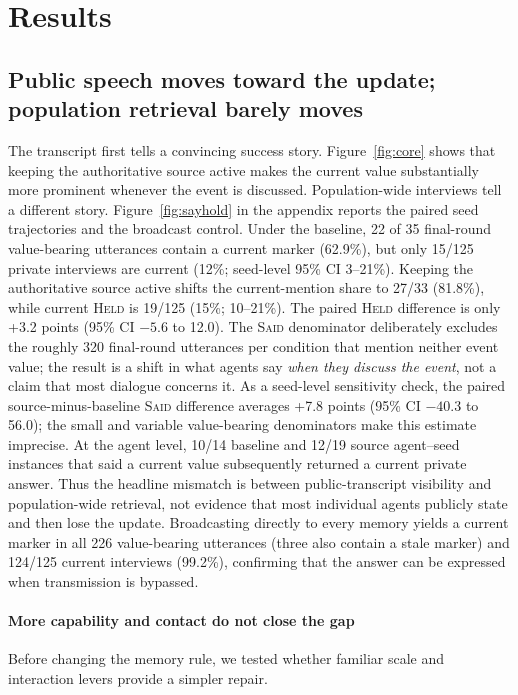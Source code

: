 \documentclass[sigconf,anonymous]{acmart}
\newcommand{\said}{\textsc{Said}}
\newcommand{\held}{\textsc{Held}}
\begin{document}
\section{Results}

\subsection{Public speech moves toward the update; population retrieval barely moves}

The transcript first tells a convincing success story.  Figure~\ref{fig:core} shows that keeping
the authoritative source active makes the current value substantially more prominent whenever
the event is discussed.  Population-wide interviews tell a different story.
Figure~\ref{fig:sayhold} in the appendix reports the paired seed trajectories and the broadcast
control.  Under the baseline, 22 of 35
final-round value-bearing utterances contain a current marker (62.9\%), but
only 15/125 private interviews are current (12\%; seed-level 95\% CI 3--21\%).  Keeping the
authoritative source active shifts the current-mention share to 27/33 (81.8\%), while current
\held{} is 19/125 (15\%; 10--21\%).  The paired \held{} difference is only
+3.2 points (95\% CI $-5.6$ to 12.0).  The \said{} denominator deliberately excludes the roughly
320 final-round utterances per condition that mention neither event value; the result is a shift
in what agents say \emph{when they discuss the event}, not a claim that most dialogue concerns it.
As a seed-level sensitivity check, the paired source-minus-baseline \said{} difference averages
+7.8 points (95\% CI $-40.3$ to 56.0); the small and variable value-bearing denominators make this
estimate imprecise.  At the agent level, 10/14 baseline and 12/19 source agent--seed instances that
said a current value subsequently returned a current private answer.  Thus the headline mismatch
is between public-transcript visibility and population-wide retrieval, not evidence that most
individual agents publicly state and then lose the update.
Broadcasting directly to every memory yields a current marker in all 226 value-bearing
utterances (three also contain a stale marker) and 124/125 current interviews (99.2\%),
confirming that the answer can be expressed when transmission is bypassed.

\paragraph{More capability and contact do not close the gap}
Before changing the memory rule, we tested whether familiar scale and interaction levers provide
a simpler repair.
\end{document}
